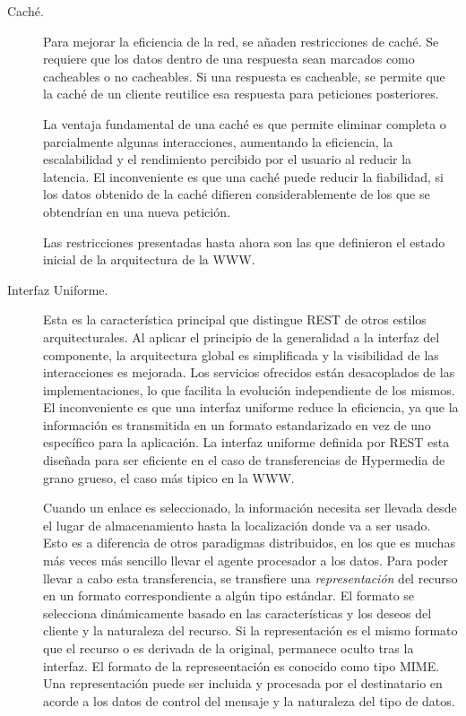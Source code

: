 \begin{description}
\item[Caché.] Para mejorar la eficiencia de la red, se añaden
  restricciones de caché. Se requiere que los datos dentro de una
  respuesta sean marcados como cacheables o no cacheables. Si una
  respuesta es cacheable, se permite que la caché de un cliente
  reutilice esa respuesta para peticiones posteriores.

  La ventaja fundamental de una caché es que permite eliminar completa
  o parcialmente algunas interacciones, aumentando la eficiencia, la
  escalabilidad y el rendimiento percibido por el usuario al reducir
  la latencia. El inconveniente es que una caché puede reducir la
  fiabilidad, si los datos obtenido de la caché difieren
  considerablemente de los que se obtendrían en una nueva petición.

  Las restricciones presentadas hasta ahora son las que definieron el
  estado inicial de la arquitectura de la WWW.

\item[Interfaz Uniforme.] Esta es la característica principal que
  distingue REST de otros estilos arquitecturales. Al aplicar el
  principio de la generalidad a la interfaz del componente, la
  arquitectura global es simplificada y la visibilidad de las
  interacciones es mejorada. Los servicios ofrecidos están
  desacoplados de las implementaciones, lo que facilita la evolución
  independiente de los mismos. El inconveniente es que una interfaz
  uniforme reduce la eficiencia, ya que la información es transmitida
  en un formato estandarizado en vez de uno específico para la
  aplicación. La interfaz uniforme definida por REST esta diseñada
  para ser eficiente en el caso de transferencias de Hypermedia de
  grano grueso, el caso más tipico en la WWW.

  Cuando un enlace es seleccionado, la información necesita ser
  llevada desde el lugar de almacenamiento hasta la localización donde
  va a ser usado. Esto es a diferencia de otros paradigmas
  distribuidos, en los que es muchas más veces más sencillo llevar el
  agente procesador a los datos. Para poder llevar a cabo esta
  transferencia, se transfiere una \emph{representación} del recurso
  en un formato correspondiente a algún tipo estándar. El formato se
  selecciona dinámicamente basado en las características y los deseos
  del cliente y la naturaleza del recurso. Si la representación es el
  mismo formato que el recurso o es derivada de la original, permanece
  oculto tras la interfaz. El formato de la represeentación es
  conocido como tipo MIME\cite{MIME}. Una representación puede ser
  incluida y procesada por el destinatario en acorde a los datos de
  control del mensaje y la naturaleza del tipo de datos.


\end{description}
